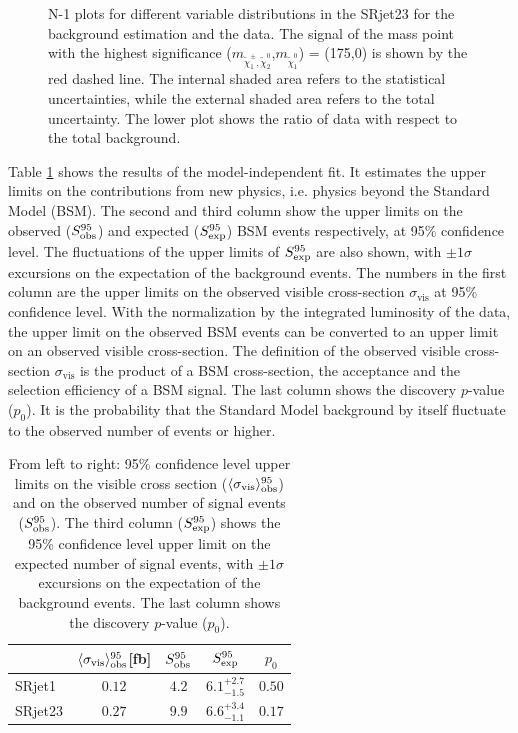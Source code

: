 \begin{figure}[htbp]
\caption{N-1 plots for different variable distributions in the SRjet23 for the background estimation and the data. The signal of the mass point with the highest significance ($m_{\tilde{\chi}_1^\pm , \tilde{\chi}_2^0}$,$m_{\tilde{\chi}_1^0}$) = (175,0) is shown by the red dashed line. The internal shaded area refers to the statistical uncertainties, while the external shaded area refers to the total uncertainty. The lower plot shows the ratio of data with respect to the total background.}
\label{fig:result_Nminus1_2}
\end{figure}

Table \ref{tab:result_upper_limit} shows the results of the model-independent fit.
It estimates the upper limits on the contributions from new physics, i.e. physics beyond the Standard Model (BSM).
The second and third column show the upper limits on the observed ($S_{\rm obs}^{95}$) and expected ($S_{\rm exp}^{95}$) BSM events respectively, at 95\% confidence level.
The fluctuations of the upper limits of $S_{\rm exp}^{95}$ are also shown, with $\pm 1\sigma$ excursions on the expectation of the background events.
The numbers in the first column are the upper limits on the observed visible cross-section $\sigma_{\text{vis}}$ at 95\% confidence level.
With the normalization by the integrated luminosity of the data, the upper limit on the observed BSM events can be converted to an upper limit on an observed visible cross-section.
The definition of the observed visible cross-section $\sigma_{\text{vis}}$ is the product of a BSM cross-section, the acceptance and the selection efficiency of a BSM signal.
The last column shows the discovery $p$-value ($p_0$).
It is the probability that the Standard Model background by itself fluctuate to the observed number of events or higher.

\begin{table}[htbp]
\begin{center}
\begin{tabular}{|l|cccc|}
\hline
& $\langle \sigma_{\text{vis}} \rangle_{\rm obs}^{95}$[fb]  &  $S_{\rm obs}^{95}$  & $S_{\rm exp}^{95}$ & $p_0$ \\
\hline
\hline
SRjet1  & $0.12$ & $4.2$ & $ { 6.1 }^{ +2.7 }_{ -1.5 }$ & $ 0.50$ \\
\hline
SRjet23 & $0.27$ & $9.9$ & $ { 6.6 }^{ +3.4 }_{ -1.1 }$ & $ 0.17$ \\
\hline
\end{tabular}
\caption{
From left to right:
95\% confidence level upper limits on the visible cross section ($\langle \sigma_{\text{vis}} \rangle_{\rm obs}^{95}$)
and on the observed number of signal events ($S_{\rm obs}^{95}$).
The third column ($S_{\rm exp}^{95}$) shows the 95\% confidence level upper limit on the expected number of signal events,
with $\pm 1\sigma$ excursions on the expectation of the background events.
The last column shows the discovery $p$-value ($p_0$).}
\label{tab:result_upper_limit}
\end{center}
\end{table}

